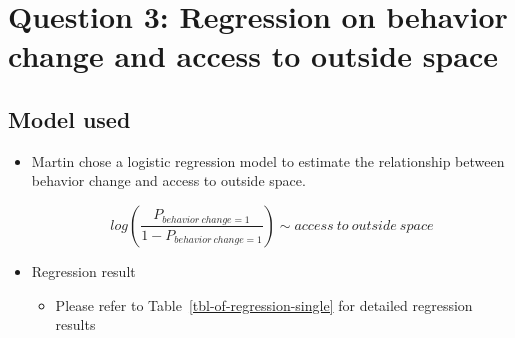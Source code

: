 \documentclass[
  letterpaper,
  DIV=11,
  numbers=noendperiod]{scrartcl}
\providecommand{\tightlist}{%
  \setlength{\itemsep}{0pt}\setlength{\parskip}{0pt}}
\begin{document}
\section{Question 3: Regression on behavior change and access to outside
space}\label{question-3-regression-on-behavior-change-and-access-to-outside-space}

\subsection{Model used}\label{model-used}

\begin{itemize}
\item
  Martin chose a logistic regression model to estimate the relationship
  between behavior change and access to outside space.

  \[
  log(\frac{P_{behavior\ change = 1}}{1- P_{behavior\ change = 1}}) \sim access\ to\ outside\ space
  \]
\item
  Regression result

  \begin{itemize}
  \tightlist
  \item
    Please refer to Table~\ref{tbl-of-regression-single} for detailed
    regression results
  \end{itemize}
\end{itemize}
\end{document}
